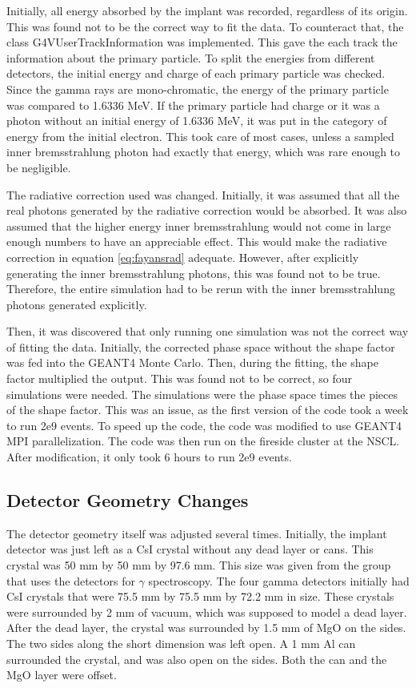 \documentclass[../MaxHughesThesis.tex]{subfiles}
\begin{document}
Initially, all energy absorbed by the implant was recorded, regardless of its origin.
This was found not to be the correct way to fit the data.
To counteract that, the class G4VUserTrackInformation was implemented.
This gave the each track the information about the primary particle.
To split the energies from different detectors, the initial energy and charge of each primary particle was checked.
Since the gamma rays are mono-chromatic, the energy of the primary particle was compared to 1.6336 MeV.
If the primary particle had charge or it was a photon without an initial energy of 1.6336 MeV, it was put in the category of energy from the initial electron. 
This took care of most cases, unless a sampled inner bremsstrahlung photon had exactly that energy, which was rare enough to be negligible.

The radiative correction used was changed.
Initially, it was assumed that all the real photons generated by the radiative correction would be absorbed.
It was also assumed that the higher energy inner bremsstrahlung would not come in large enough numbers to have an appreciable effect. 
This would make the radiative correction in equation \ref{eq:fayansrad} adequate. 
However, after explicitly generating the inner bremsstrahlung photons, this was found not to be true.
Therefore, the entire simulation had to be rerun with the inner bremsstrahlung photons generated explicitly.

Then, it was discovered that only running one simulation was not the correct way of fitting the data.
Initially, the corrected phase space without the shape factor was fed into the GEANT4 Monte Carlo.
Then, during the fitting, the shape factor multiplied the output. 
This was found not to be correct, so four simulations were needed.
The simulations were the phase space times the pieces of the shape factor.
This was an issue, as the first version of the code took a week to run 2e9 events.
To speed up the code, the code was modified to use GEANT4 MPI parallelization.
The code was then run on the fireside cluster at the NSCL.
After modification, it only took 6 hours to run 2e9 events.

\subsection{Detector Geometry Changes}
The detector geometry itself was adjusted several times.
Initially, the implant detector was just left as a CsI crystal without any dead layer or cans.
This crystal was 50 mm by 50 mm by 97.6 mm.
This size was given from the group that uses the detectors for $\gamma$ spectroscopy.
The four gamma detectors initially had CsI crystals that were 75.5 mm by 75.5 mm by 72.2 mm in size.
These crystals were surrounded by 2 mm of vacuum, which was supposed to model a dead layer.
After the dead layer, the crystal was surrounded by 1.5 mm of MgO on the sides.
The two sides along the short dimension was left open.
A 1 mm Al can surrounded the crystal, and was also open on the sides.
Both the can and the MgO layer were offset.
\end{document}
